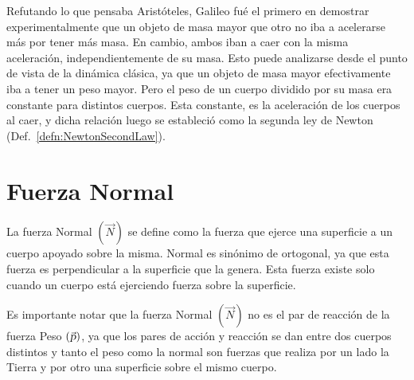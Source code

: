 \documentclass[a5paper,12pt,twoside]{book}
\begin{document}
Refutando lo que pensaba Aristóteles, Galileo fué el primero en demostrar experimentalmente que un objeto de masa mayor que otro no iba a acelerarse más por tener más masa.
En cambio, ambos iban a caer con la misma aceleración, independientemente de su masa.
Esto puede analizarse desde el punto de vista de la dinámica clásica, ya que un objeto de masa mayor efectivamente iba a tener un peso mayor.
Pero el peso de un cuerpo dividido por su masa era constante para distintos cuerpos.
Esta constante, es la aceleración de los cuerpos al caer, y dicha relación luego se estableció como la segunda ley de Newton (Def.\ \ref{defn:NewtonSecondLaw}).


\section{Fuerza Normal}

La fuerza Normal $(\Vec{N})$ se define como la fuerza que ejerce una superficie a un cuerpo apoyado sobre la misma.
Normal es sinónimo de ortogonal, ya que esta fuerza es perpendicular a la superficie que la genera.
Esta fuerza existe solo cuando un cuerpo está ejerciendo fuerza sobre la superficie.

Es importante notar que la fuerza Normal $(\Vec{N})$ no es el par de reacción de la fuerza Peso $(\Vec{\textsl{p}})$, ya que los pares de acción y reacción se dan entre dos cuerpos distintos y tanto el peso como la normal son fuerzas que realiza por un lado la Tierra y por otro una superficie sobre el mismo cuerpo.
\end{document}
